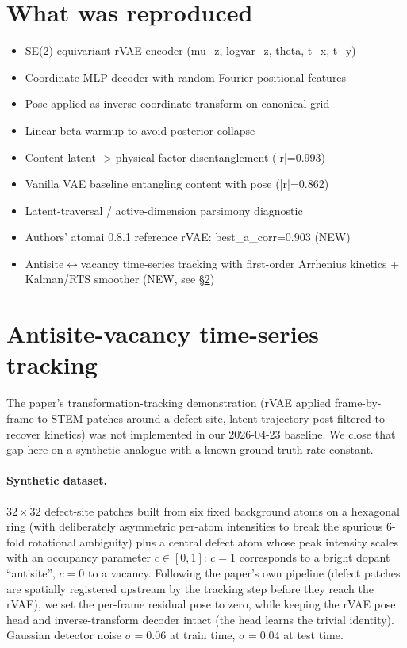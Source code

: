 \documentclass[11pt]{article}
\begin{document}
\section{What was reproduced}
\begin{itemize}
\item SE(2)-equivariant rVAE encoder (mu\_z, logvar\_z, theta, t\_x, t\_y)
\item Coordinate-MLP decoder with random Fourier positional features
\item Pose applied as inverse coordinate transform on canonical grid
\item Linear beta-warmup to avoid posterior collapse
\item Content-latent -\textgreater{} physical-factor disentanglement (|r|=0.993)
\item Vanilla VAE baseline entangling content with pose (|r|=0.862)
\item Latent-traversal / active-dimension parsimony diagnostic
\item Authors' atomai 0.8.1 reference rVAE: best\_a\_corr=0.903 (NEW)
\item Antisite$\leftrightarrow$vacancy time-series tracking with first-order Arrhenius kinetics + Kalman/RTS smoother (NEW, see \S\ref{sec:timeseries})
\end{itemize}

\section{Antisite-vacancy time-series tracking}\label{sec:timeseries}

The paper's transformation-tracking demonstration (rVAE applied frame-by-frame
to STEM patches around a defect site, latent trajectory post-filtered to
recover kinetics) was not implemented in our 2026-04-23 baseline. We close
that gap here on a synthetic analogue with a known ground-truth rate constant.

\paragraph{Synthetic dataset.}
$32\times 32$ defect-site patches built from six fixed background atoms on a
hexagonal ring (with deliberately asymmetric per-atom intensities to break the
spurious 6-fold rotational ambiguity) plus a central defect atom whose peak
intensity scales with an occupancy parameter $c\in[0,1]$:
$c=1$ corresponds to a bright dopant ``antisite'', $c=0$ to a vacancy.
Following the paper's own pipeline (defect patches are spatially registered
upstream by the tracking step before they reach the rVAE), we set the per-frame
residual pose to zero, while keeping the rVAE pose head and inverse-transform
decoder intact (the head learns the trivial identity).
Gaussian detector noise $\sigma=0.06$ at train time, $\sigma=0.04$ at
test time.
\end{document}

